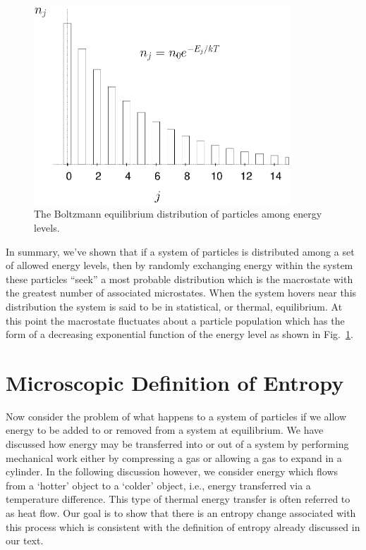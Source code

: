 \begin{figure}[tbp]
\begin{center}
\includegraphics[width=3.8in]{statistical_mechanics/boltz-dist.eps}
\end{center}
\caption{The Boltzmann equilibrium distribution of particles among
energy levels.}
\label{fig:boltz-dist}
\end{figure}

In summary, we've shown that if a system of particles is distributed
among a set of allowed energy levels, then by randomly exchanging
energy within the system these particles ``seek'' a most probable
distribution which is the macrostate with the greatest number of
associated microstates.  When the system hovers near this distribution
the system is said to be in statistical, or thermal, equilibrium.  At
this point the macrostate fluctuates about a particle population which
has the form of a decreasing exponential function of the energy level
as shown in Fig.~\ref{fig:boltz-dist}.
     
     
\section{Microscopic Definition of Entropy}
\label{sec:entropy-def}

Now consider the problem of what happens to a system of particles if
we allow energy to be added to or removed from a system at
equilibrium.  We have discussed how energy may be transferred into or
out of a system by performing mechanical work either by compressing a
gas or allowing a gas to expand in a cylinder.  In the following
discussion however, we consider energy which flows from a `hotter'
object to a `colder' object, i.e., energy transferred via a temperature
difference.  This type of thermal energy transfer is often referred to
as heat flow.  Our goal is to show that there is an entropy change
associated with this process which is consistent with the definition
of entropy already discussed in our text.

